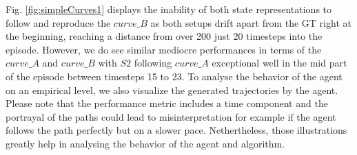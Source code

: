 Fig. \ref{fig:simpleCurves1} displays the inability of both state representations to follow and reproduce the $curve\_B$ as both setups drift apart from the GT right at the beginning, reaching a distance from over 200 just 20 timesteps into the episode. However, we do see similar mediocre performances in terms of the $curve\_A$ and $curve\_B$ with $S2$ following $curve\_A$ exceptional well in the mid part of the episode between timesteps 15 to 23. To analyse the behavior of the agent on an empirical level, we also visualize the generated trajectories by the agent. Please note that the performance metric includes a  time component and the portrayal of the paths could lead to misinterpretation for example if the agent follows the path perfectly but on a slower pace. Nethertheless, those illustrations greatly help in analysing the behavior of the agent and algorithm. 

